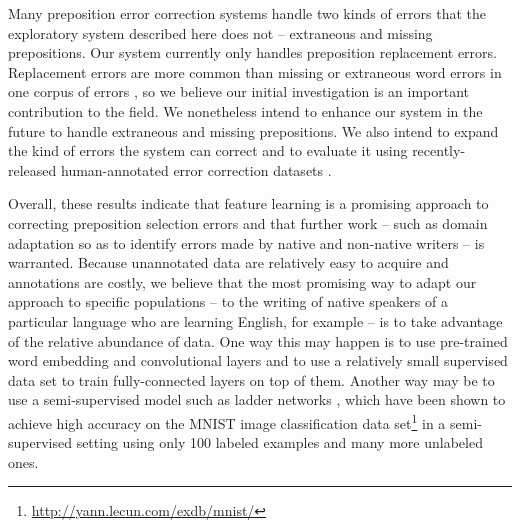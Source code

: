 Many preposition error correction systems handle two kinds of errors that the exploratory system described here does not -- extraneous and missing prepositions.  Our system currently only handles preposition replacement errors.  Replacement errors are more common than missing or extraneous word errors in one corpus of errors \cite{andersen2007grammatical}, so we believe our initial investigation is an important contribution to the field.  We nonetheless intend to enhance our system in the future to handle extraneous and missing prepositions.  We also intend to expand the kind of errors the system can correct and to evaluate it using recently-released human-annotated error correction datasets \cite{dale2011helping,ng2013conll,ng2014conll}.  

Overall, these results indicate that feature learning is a promising approach to correcting preposition selection errors and that further work -- such as domain adaptation so as to identify errors made by native and non-native writers -- is warranted.  Because unannotated data are relatively easy to acquire and annotations are costly, we believe that the most promising way to adapt our approach to specific populations -- to the writing of native speakers of a particular language who are learning English, for example -- is to take advantage of the relative abundance of data.  One way this may happen is to use pre-trained word embedding and convolutional layers and to use a relatively small supervised data set to train fully-connected layers on top of them.  Another way may be to use a semi-supervised model such as ladder networks \cite{rasmus2015semi}, which have been shown to achieve high accuracy on the MNIST image classification data set\footnote{\url{http://yann.lecun.com/exdb/mnist/}} in a semi-supervised setting using only 100 labeled examples and many more unlabeled ones.   




%
%

%
%

%
